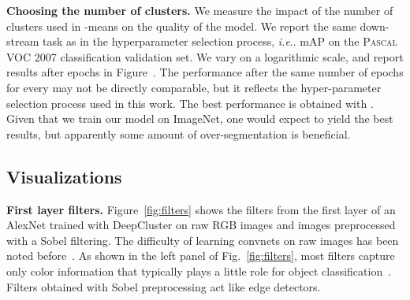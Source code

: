 \documentclass[runningheads]{llncs}
\makeatletter
\DeclareRobustCommand\onedot{\futurelet\@let@token\@onedot}
\def\@onedot{\ifx\@let@token.\else.\null\fi\xspace}
\def\ie{\emph{i.e}\onedot} \def\Ie{\emph{I.e}\onedot}
\def\OURS{DeepCluster\xspace}
\makeatother
\begin{document}
\noindent\textbf{Choosing the number of clusters.}
We measure the impact of the number  of clusters used in -means on the quality of the model.
We report the same down-stream task as in the hyperparameter selection process, \ie mAP on the \textsc{Pascal} VOC 2007 classification validation set.
We vary  on a logarithmic scale, and report results after  epochs in Figure~.
The performance after the same number of epochs for every  may not be directly comparable, but it reflects the hyper-parameter selection process
used in this work.
The best performance is obtained with .
Given that we train our model on ImageNet, one would expect  to yield the best results, but apparently some amount of over-segmentation is beneficial.



\subsection{Visualizations}
\label{sec:viz}

\noindent\textbf{First layer filters.}
Figure~\ref{fig:filters} shows the filters from the first layer of an AlexNet trained with \OURS on raw RGB images and images preprocessed with a Sobel filtering.
The difficulty of learning convnets on raw images has been noted before~\cite{bojanowski2017unsupervised,doersch2015unsupervised,noroozi2016unsupervised,paulin2015local}.
As shown in the left panel of Fig.~\ref{fig:filters}, most filters capture only color information that typically plays a little role for object classification~\cite{van2011evaluating}.
Filters obtained with Sobel preprocessing act like edge detectors.
\\
\end{document}
